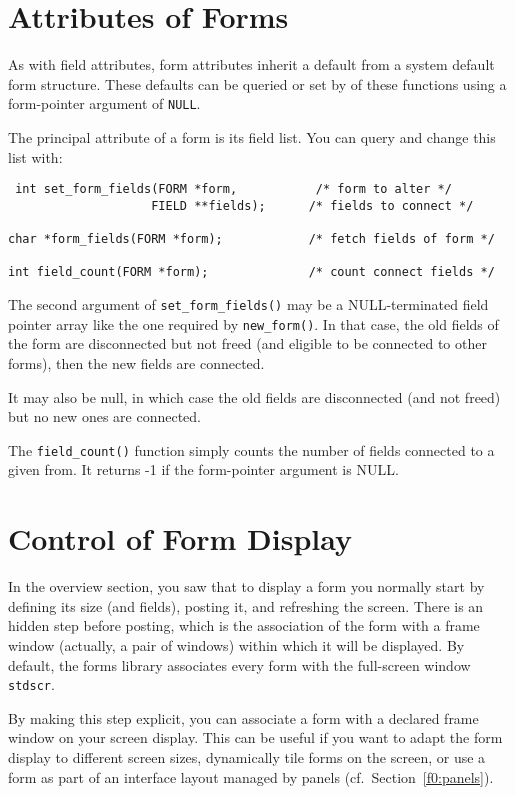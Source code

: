 \section{Attributes of Forms}

\label{f0:formattrs}As with field attributes, form attributes inherit a default from a
system default form structure.  These defaults can be queried or set by
of these functions using a form-pointer argument of \texttt{NULL}. 

The principal attribute of a form is its field list.  You can query
and change this list with:
\begin{verbatim} int set_form_fields(FORM *form,           /* form to alter */
                    FIELD **fields);      /* fields to connect */

char *form_fields(FORM *form);            /* fetch fields of form */

int field_count(FORM *form);              /* count connect fields */
\end{verbatim}
The second argument of \texttt{set\_form\_fields()} may be a
NULL-terminated field pointer array like the one required by
\texttt{new\_form()}. In that case, the old fields of the form are
disconnected but not freed (and eligible to be connected to other
forms), then the new fields are connected. 

It may also be null, in which case the old fields are disconnected
(and not freed) but no new ones are connected. 

The \texttt{field\_count()} function simply counts the number of fields
connected to a given from.  It returns -1 if the form-pointer argument
is NULL.

\section{Control of Form Display}

\label{f0:fdisplay}In the overview section, you saw that to display a form you normally
start by defining its size (and fields), posting it, and refreshing
the screen.  There is an hidden step before posting, which is the
association of the form with a frame window (actually, a pair of
windows) within which it will be displayed.  By default, the forms
library associates every form with the full-screen window
\texttt{stdscr}. 

By making this step explicit, you can associate a form with a declared
frame window on your screen display.  This can be useful if you want to
adapt the form display to different screen sizes, dynamically tile
forms on the screen, or use a form as part of an interface layout
managed by panels (cf.\ Section~\ref{f0:panels}). 

